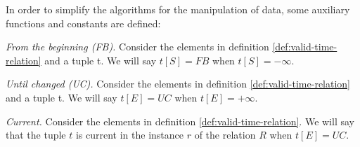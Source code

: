 % 
% 
% 
In order to simplify the algorithms for the manipulation of data, some auxiliary functions and constants are defined:


\begin{definition}
 \label{def:from-beginning}
\emph{From the beginning (FB).} 
Consider the elements in definition \ref{def:valid-time-relation} and a tuple t. We will say $t[S]=FB$ when $t[S]=- \infty$. 
\end{definition}

\begin{definition}
 \label{def:until-changed}
\emph{Until changed (UC).} 
Consider the elements in definition \ref{def:valid-time-relation} and a tuple t. We will say $t[E]=UC$ when $t[E]=+ \infty$. 
\end{definition}

\begin{definition}
\emph{Current.} 
Consider the elements in definition \ref{def:valid-time-relation}. We will say that the tuple $t$ is current in the instance $r$ of the relation $R$ when $t[E]=UC$.
\end{definition}


